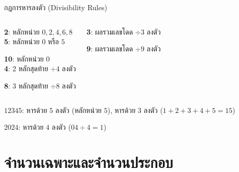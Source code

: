 \documentclass[11pt, aspectratio=169]{beamer}
\begin{document}
\begin{frame}{กฎการหารลงตัว (Divisibility Rules)}
  \begin{columns}[T]
      \begin{explanation}[หลักหน่วย/หลักสุดท้าย]
        \textbf{2}: หลักหน่วย $0,2,4,6,8$ \\
        \textbf{5}: หลักหน่วย $0$ หรือ $5$

        \textbf{10}: หลักหน่วย $0$ \\
        \textbf{4}: 2 หลักสุดท้าย $\div 4$ ลงตัว

        \textbf{8}: 3 หลักสุดท้าย $\div 8$ ลงตัว
      \end{explanation}
      \begin{explanation}[ผลรวมเลขโดด]
        \textbf{3}: ผลรวมเลขโดด $\div 3$ ลงตัว

        \textbf{9}: ผลรวมเลขโดด $\div 9$ ลงตัว
      \end{explanation}
  \end{columns}

  \begin{exambox}[ตัวอย่าง]
    $12345$: หารด้วย $5$ ลงตัว (หลักหน่วย $5$), หารด้วย $3$ ลงตัว ($1+2+3+4+5=15$)

    $2024$: หารด้วย $4$ ลงตัว ($04 \div 4 = 1$)
  \end{exambox}
\end{frame}

\section{จำนวนเฉพาะและจำนวนประกอบ}
\end{document}
